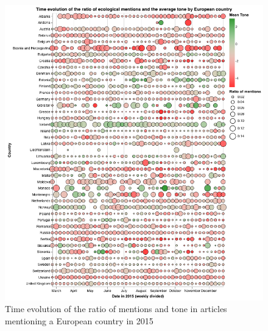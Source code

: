 \documentclass[a4paper]{article}
\begin{document}
\begin{figure}[h]
   \centering
   \includegraphics[scale=0.5]{timeline_europe_2015.png}
    \caption{\label{timeline_wide_1} Time evolution of the ratio of mentions and tone in articles mentioning a European country in 2015}
\end{figure}
\end{document}
